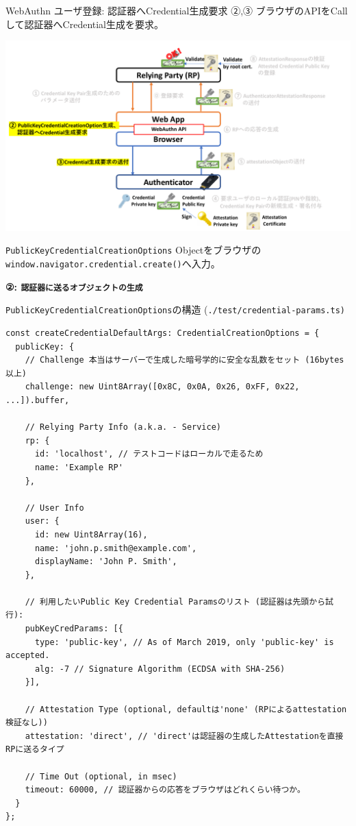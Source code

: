 \documentclass[12pt,dvipdfmx,uplatex]{beamer}
\begin{document}
\begin{frame}{WebAuthn ユーザ登録: 認証器へCredential生成要求}
②,③ ブラウザのAPIをCallして認証器へCredential生成を要求。
\begin{center}
\includegraphics[width=0.9\linewidth]{Figs/webauthn-registration2.pdf}
\end{center}
\texttt{PublicKeyCredentialCreationOptions} Objectをブラウザの\texttt{window.navigator.credential.create()}へ入力。
\end{frame}

\begin{frame}[fragile]
\small
\textbf{②: \texttt{認証器に送るオブジェクトの生成}}

\begin{exampleblock}{\scriptsize \texttt{PublicKeyCredentialCreationOptions}の構造 (\texttt{./test/credential-params.ts)}}
{\tiny
\begin{verbatim}
const createCredentialDefaultArgs: CredentialCreationOptions = {
  publicKey: {
    // Challenge 本当はサーバーで生成した暗号学的に安全な乱数をセット (16bytes以上)
    challenge: new Uint8Array([0x8C, 0x0A, 0x26, 0xFF, 0x22, ...]).buffer,

    // Relying Party Info (a.k.a. - Service)
    rp: {
      id: 'localhost', // テストコードはローカルで走るため
      name: 'Example RP'
    },

    // User Info
    user: {
      id: new Uint8Array(16),
      name: 'john.p.smith@example.com',
      displayName: 'John P. Smith',
    },

    // 利用したいPublic Key Credential Paramsのリスト (認証器は先頭から試行):
    pubKeyCredParams: [{
      type: 'public-key', // As of March 2019, only 'public-key' is accepted.
      alg: -7 // Signature Algorithm (ECDSA with SHA-256)
    }],

    // Attestation Type (optional, defaultは'none' (RPによるattestation検証なし))
    attestation: 'direct', // 'direct'は認証器の生成したAttestationを直接RPに送るタイプ

    // Time Out (optional, in msec)
    timeout: 60000, // 認証器からの応答をブラウザはどれくらい待つか。
  }
};
\end{verbatim}
}
\end{exampleblock}
\end{frame}
\end{document}
